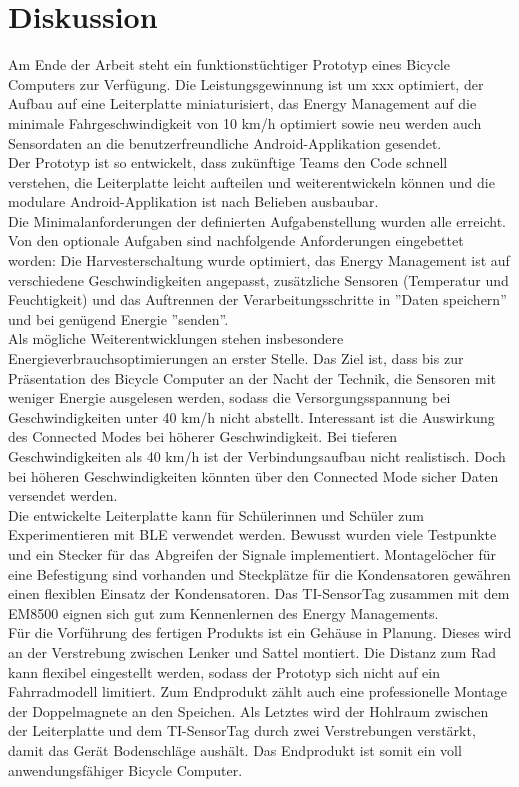 \chapter{Diskussion}

Am Ende der Arbeit steht ein funktionstüchtiger Prototyp eines Bicycle Computers zur Verfügung. Die Leistungsgewinnung ist um xxx  optimiert, der Aufbau auf eine Leiterplatte miniaturisiert, das Energy Management auf die minimale Fahrgeschwindigkeit von 10 km/h optimiert sowie neu werden auch Sensordaten an die benutzerfreundliche Android-Applikation gesendet.\\

Der Prototyp ist so entwickelt, dass zukünftige Teams den Code schnell verstehen, die Leiterplatte leicht aufteilen und weiterentwickeln können und die modulare Android-Applikation ist nach Belieben ausbaubar.\\

Die Minimalanforderungen der definierten Aufgabenstellung wurden alle erreicht. Von den optionale Aufgaben sind nachfolgende Anforderungen eingebettet worden: Die Harvesterschaltung wurde optimiert, das Energy Management ist auf verschiedene Geschwindigkeiten angepasst, zusätzliche Sensoren (Temperatur und Feuchtigkeit) und das Auftrennen der Verarbeitungsschritte in ''Daten speichern'' und bei genügend Energie ''senden''.\\

Als mögliche Weiterentwicklungen stehen insbesondere Energieverbrauchsoptimierungen an erster Stelle. Das Ziel ist, dass bis zur Präsentation des Bicycle Computer an der Nacht der Technik, die Sensoren mit weniger Energie ausgelesen werden, sodass die Versorgungsspannung bei Geschwindigkeiten unter 40 km/h nicht abstellt. Interessant ist die Auswirkung des Connected Modes bei höherer Geschwindigkeit. Bei tieferen Geschwindigkeiten als 40 km/h ist der Verbindungsaufbau nicht realistisch. Doch bei höheren Geschwindigkeiten könnten über den Connected Mode sicher Daten versendet werden.\\

Die entwickelte Leiterplatte kann für Schülerinnen und Schüler zum Experimentieren mit BLE verwendet werden. Bewusst wurden viele Testpunkte und ein Stecker für das Abgreifen der Signale implementiert. Montagelöcher für eine Befestigung sind vorhanden und Steckplätze für die Kondensatoren gewähren einen flexiblen Einsatz der Kondensatoren. Das TI-SensorTag zusammen mit dem EM8500 eignen sich gut zum Kennenlernen des Energy Managements.\\
\newpage
Für die Vorführung des fertigen Produkts ist ein Gehäuse in Planung. Dieses wird an der Verstrebung zwischen Lenker und Sattel montiert. Die Distanz zum Rad kann flexibel eingestellt werden, sodass der Prototyp sich nicht auf ein Fahrradmodell limitiert. Zum Endprodukt zählt auch eine professionelle Montage der Doppelmagnete an den Speichen. Als Letztes wird der Hohlraum zwischen der Leiterplatte und dem TI-SensorTag durch zwei Verstrebungen verstärkt, damit das Gerät Bodenschläge aushält. Das Endprodukt ist somit ein voll anwendungsfähiger Bicycle Computer.\\

